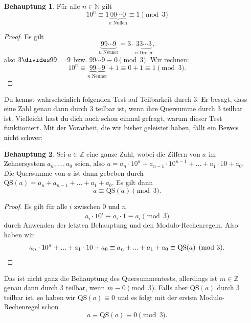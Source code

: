 \documentclass[a4paper,ngerman,12pt]{scrartcl}
\newcommand{\N}{\mathbb{N}}
\newcommand{\Z}{\mathbb{Z}}
\theoremstyle{definition}
\newtheorem{defn}{Definition}
\newtheorem{satz}{Behauptung}
\newtheorem*{bsp}{Beispiel}
\begin{document}

\begin{satz}
  Für alle $n \in \N$ gilt
  \[ 10^n \equiv 1\underbrace{00\cdots0}_{n \text{ Nullen}} \equiv 1 \pmod{3} \]
\end{satz}

\begin{proof}
  Es gilt
  \[ \underbrace{99 \cdots 9}_{n \text{ Neuner}} = 3 \cdot \underbrace{33 \cdots 3}_{n \text{ Dreier}}, \]
  also $3 \divides 99 \cdots 9$ bzw. $99 \cdots 9 \equiv 0 \pmod{3}$. Wir rechnen:
  \[ 10^n \equiv \underbrace{99 \cdots 9}_{n \text{ Neuner}} + 1 \equiv 0 + 1 \equiv 1 \pmod{3}. \]
\end{proof}

Du kennst wahrscheinlich folgenden Test auf Teilbarkeit durch $3$: Er besagt, dass eine Zahl genau dann durch $3$ teilbar ist, wenn ihre Quersumme durch $3$ teilbar ist. Vielleicht hast du dich auch schon einmal gefragt, warum dieser Test funktioniert. Mit der Vorarbeit, die wir bisher geleistet haben, fällt ein Beweis nicht schwer:

\begin{satz}
  Sei $a \in \Z$ eine ganze Zahl, wobei die Ziffern von $a$ im Zehnersystem $a_n, ..., a_0$ seien, also $a = a_n \cdot 10^n + a_{n-1} \cdot 10^{n-1} + ... + a_1 \cdot 10 + a_0$. Die Quersumme von $a$ ist dann gebeben durch $\mathrm{QS}(a) = a_n + a_{n-1} + ... + a_1 + a_0$. Es gilt dann
  \[ a \equiv \mathrm{QS}(a) \pmod{3}. \]
\end{satz}

\begin{proof}
  Es gilt für alle $i$ zwischen $0$ und $n$
  \[ a_i \cdot 10^i \equiv a_i \cdot 1 \equiv a_i \pmod{3} \]
  durch Anwenden der letzten Behauptung und den Modulo-Rechenregeln. Also haben wir
  \[ a_n \cdot 10^n + ... + a_1 \cdot 10 + a_0 \equiv a_n + ... + a_1 + a_0 \equiv \mathrm{QS}(a) \pmod{3}. \qedhere \]
\end{proof}

Das ist nicht ganz die Behauptung des Quersummentests, allerdings ist $m \in \Z$ genau dann durch $3$ teilbar, wenn $m \equiv 0 \pmod{3}$. Falls aber $\mathrm{QS}(a)$ durch $3$ teilbar ist, so haben wir $\mathrm{QS}(a) \equiv 0$ und es folgt mit der ersten Modulo-Rechenregel schon
\[ a \equiv \mathrm{QS}(a) \equiv 0 \pmod{3}. \]
\end{document}
